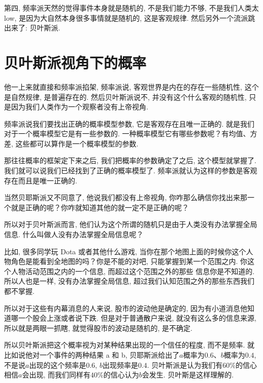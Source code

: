 第四, 频率派天然的觉得事件本身就是随机的, 不是我们能力不够, 不是我们人类太 low, 是因为大自然本身很多事情就是随机的, 这是客观规律. 然后另外一个流派跳出来了: 贝叶斯派. 

\section{贝叶斯派视角下的概率}

他一上来就直接和频率派掐架, 频率派说, 客观世界是内在的存在一些随机性, 这个是自然规律, 是普遍存在的. 然后贝叶斯派说不, 并没有这个什么客观的随机性, 只是因为我们人类作为一个观察者没有上帝视角. 

频率派说我们要找出正确的概率模型参数, 它是客观存在且唯一正确的. 就是我们对于一个概率模型它是有一些参数的. 一种概率模型它有哪些参数呢？有均值、方差, 这些都可以算作是一个概率模型的参数. 

那往往概率的框架定下来之后, 我们把概率的参数确定了之后, 这个模型就掌握了. 我们就可以说我们已经找到了正确的概率模型了. 频率派就认为这样的参数是客观存在而且是唯一正确的. 

当然贝耶斯派又不同意了, 他说我们都没有上帝视角, 你咋那么确信你找出来那一个就是正确的呢？你咋就知道其他的就一定不是正确的呢？

所以对于贝叶斯派而言, 他们认为这个所谓的随机只是由于人类没有办法掌握全局信息. 什么叫做人没有办法掌握全局信息呢？

比如, 很多同学玩 Dota 或者其他什么游戏, 当你在那个地图上面的时候你这个人物角色是能看到全地图的吗？你是不能的对吧, 只能掌握到某一个范围之内. 你这个人物活动范围之内的一个信息, 而超过这个范围之外的那些
信息你是不知道的. 所以人也是一样, 没有办法掌握全局信息, 超过我们认知范围之外的那些东西我们都不掌握. 

所以对于这些有内幕消息的人来说, 股市的波动他是确定的, 因为有小道消息他知道哪一个股会上涨或者说下跌. 但是对于普通散户来说, 就没有这么多的信息来源, 所以就是两眼一抓瞎, 就觉得股市的波动是随机的, 是不确定. 

所以贝叶斯派把这个概率视为对某种结果出现的一个信任的程度, 而不是频率. 就比如说他对一个事件的两种结果 a 和 b, 贝耶斯派给出了$a$概率为$0.6$、$b$概率为$0.4$, 不是说$a$出现的这个频率是$0.6$, $b$出现频率是$0.4$. 贝叶斯派是认为我们有$60\%$的信心相信$a$会出现, 而我们同样有$40\%$的信心认为$b$会发生. 贝叶斯是这样理解的. 

